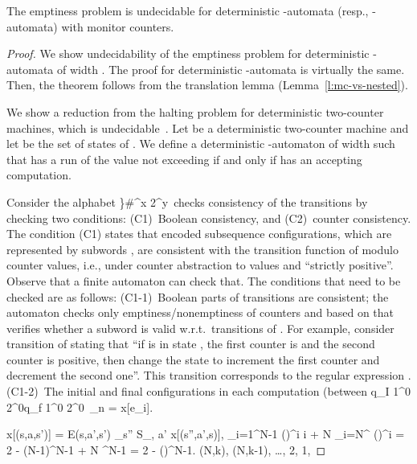 \documentclass{lmcs}
\newcommand{\M}{\mathbf{M}}
\begin{document}
\begin{thm}\label{th:undecidable-limsup}
The emptiness problem is undecidable for deterministic -automata (resp., -automata) with  monitor counters.
\end{thm}
\begin{proof}
We show undecidability of the emptiness problem for  deterministic -automata of width .
The proof for deterministic -automata is virtually the same.
Then, the theorem follows from the translation lemma (Lemma~\ref{l:mc-vs-nested}).


We show a reduction from the halting problem for deterministic two-counter machines, which is undecidable~\cite{minsky1961recursive}.
Let  be a deterministic two-counter machine and let  be the set of states of .
We define a deterministic -automaton  of width  such that
 has a run of the value not exceeding  if and only if  has an accepting computation.

Consider the alphabet \}\M\#^{x} 2^{y}\M\,   checks consistency of the transitions by checking two conditions: (C1)~Boolean consistency, and (C2)~counter consistency.
The condition (C1) states that encoded subsequence configurations, which are represented by subwords  ,
 are consistent with the transition function of  modulo counter values, i.e., under counter abstraction to values  and ``strictly positive''.
Observe that a finite automaton can check that. The conditions that need to be checked are as follows:
(C1-1)~Boolean parts of transitions are consistent; the automaton checks only emptiness/nonemptiness of counters and based on that verifies whether a subword  is valid w.r.t.\ transitions of .
For example, consider transition  of  stating that ``if  is in state , the first counter
is  and the second counter is positive, then change the state to  increment the first counter and
decrement the second one''. This transition corresponds to the regular expression
.
(C1-2)~The initial and final configurations in each computation (between q_I 1^0 2^0q_f 1^0 2^0\
\lim_{n \to \infty}  = x[e_i].
\label{eq:correctness-silent}

x[(s,a,s')] = E(s,a',s') \cdot \sum_{s'' \in S_{\silentMarkov}, a' \in \Sigma} x[(s'',a',s)],
 \sum_{i=1}^{N-1} {\left(\right)}^{i} \cdot i + N \sum_{i=N}^{\infty} {\left(\frac{1}{2}\right)}^i = 	2 - (N-1)^{N-1} + N ^{N-1} = 2 -  {\left(\right)}^{N-1}.
    \min(N,k), \min(N,k-1), \ldots, 2, 1,


\end{proof}
\end{document}
